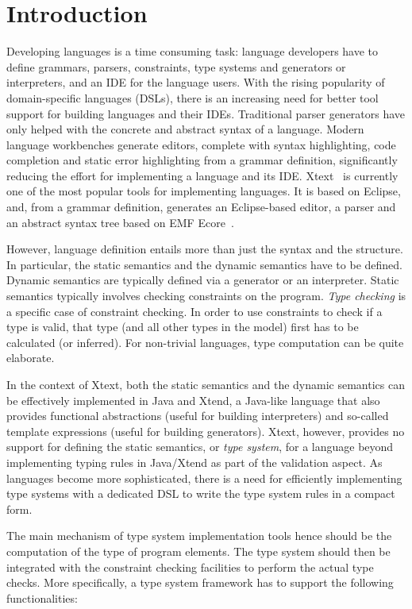 \section{Introduction}
\label{sec:introduction}
 
Developing languages is a time consuming task: language developers have to
define grammars, parsers, constraints, type systems and generators or
interpreters, and an IDE for the language users. With the rising popularity of
domain-specific languages (DSLs), there is an increasing need for better tool
support for building languages and their IDEs. Traditional parser generators
have only helped with the concrete and abstract syntax of a language. Modern
language workbenches generate editors, complete with syntax highlighting, code
completion and static error highlighting from a grammar definition,
significantly reducing the effort for implementing a language and its IDE.
Xtext~\cite{xtext} is currently one of the most popular tools for implementing
languages.
It is based on Eclipse, and, from a grammar definition, generates an
Eclipse-based editor, a parser and an abstract syntax tree based on EMF
Ecore~\cite{EMF08}.

However, language definition entails more than just the syntax and the
structure. In particular, the static semantics and the dynamic semantics have
to be defined. Dynamic semantics are typically defined via a generator or an
interpreter.  Static semantics typically involves checking constraints on the
program.
\emph{Type checking} is a specific case of constraint checking. In order to use
constraints to check if a type is valid, that type (and all other types in the
model) first has to be calculated (or inferred). For non-trivial languages, type
computation can be quite elaborate.

In the context of Xtext, both the static semantics and the dynamic semantics can
be effectively implemented in Java and Xtend, a Java-like language that also provides functional
abstractions (useful for building interpreters) and so-called template expressions (useful for
building generators). Xtext, however, provides no support for defining the
static semantics, or \emph{type system}, for a language beyond implementing
typing rules in Java/Xtend as part of the validation aspect. As languages become
more sophisticated, there is a need for efficiently implementing type systems
with a dedicated DSL to write the type system rules in a compact form.

The main mechanism of type system implementation tools hence should be the
computation of the type of program elements. The type system should then be
integrated with the constraint checking facilities to perform the actual type checks. More
specifically, a type system framework has to support the following
functionalities:

